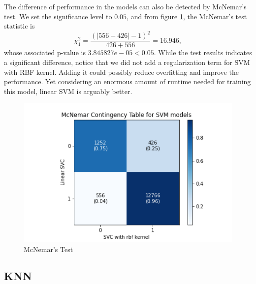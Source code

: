 \documentclass[10pt,twocolumn,letterpage]{article}
\begin{document}
		The difference of performance in the models can also be detected by McNemar's test.  We set the significance level to $0.05$, and from figure \ref{McNemar_SVM}, the McNemar's test statistic is $$\chi^2_{1} = \frac{(|556-426|-1)^2}{426+556} = 16.946,$$ whose associated p-value is $3.845827e-05 < 0.05$. While the test results indicates a significant difference, notice that we did not add a regularization term for SVM with RBF kernel. Adding it could possibly reduce overfitting and improve the performance. Yet considering an enormous amount of runtime needed for training this model, linear SVM is arguably better. 
		\begin{figure}[htbp]
			\includegraphics[width=\columnwidth]{McNemar_SVM}
			\caption{McNemar's Test}\label{McNemar_SVM}
		\end{figure} 
		\subsection{KNN}
\end{document}
